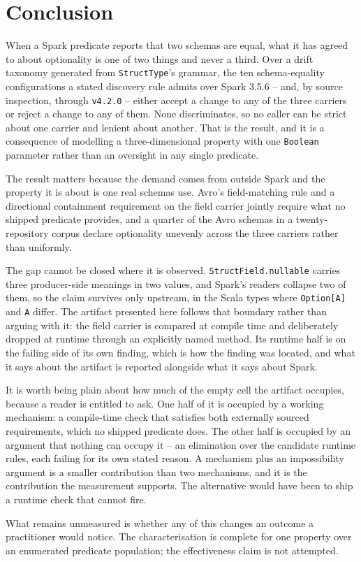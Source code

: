 \section{Conclusion}

When a Spark predicate reports that two schemas are equal, what it has agreed to about optionality is one of two things and never a third. Over a drift taxonomy generated from \texttt{StructType}'s grammar, the ten schema-equality configurations a stated discovery rule admits over Spark 3.5.6 -- and, by source inspection, through \texttt{v4.2.0} -- either accept a change to any of the three carriers or reject a change to any of them. None discriminates, so no caller can be strict about one carrier and lenient about another. That is the result, and it is a consequence of modelling a three-dimensional property with one \texttt{Boolean} parameter rather than an oversight in any single predicate.

The result matters because the demand comes from outside Spark and the property it is about is one real schemas use. Avro's field-matching rule and a directional containment requirement on the field carrier jointly require what no shipped predicate provides, and a quarter of the Avro schemas in a twenty-repository corpus declare optionality unevenly across the three carriers rather than uniformly.

The gap cannot be closed where it is observed. \texttt{StructField.nullable} carries three producer-side meanings in two values, and Spark's readers collapse two of them, so the claim survives only upstream, in the Scala types where \texttt{Option[A]} and \texttt{A} differ. The artifact presented here follows that boundary rather than arguing with it: the field carrier is compared at compile time and deliberately dropped at runtime through an explicitly named method. Its runtime half is on the failing side of its own finding, which is how the finding was located, and what it says about the artifact is reported alongside what it says about Spark.

It is worth being plain about how much of the empty cell the artifact occupies, because a reader is entitled to ask. One half of it is occupied by a working mechanism: a compile-time check that satisfies both externally sourced requirements, which no shipped predicate does. The other half is occupied by an argument that nothing can occupy it -- an elimination over the candidate runtime rules, each failing for its own stated reason. A mechanism plus an impossibility argument is a smaller contribution than two mechanisms, and it is the contribution the measurement supports. The alternative would have been to ship a runtime check that cannot fire.

What remains unmeasured is whether any of this changes an outcome a practitioner would notice. The characterisation is complete for one property over an enumerated predicate population; the effectiveness claim is not attempted.
